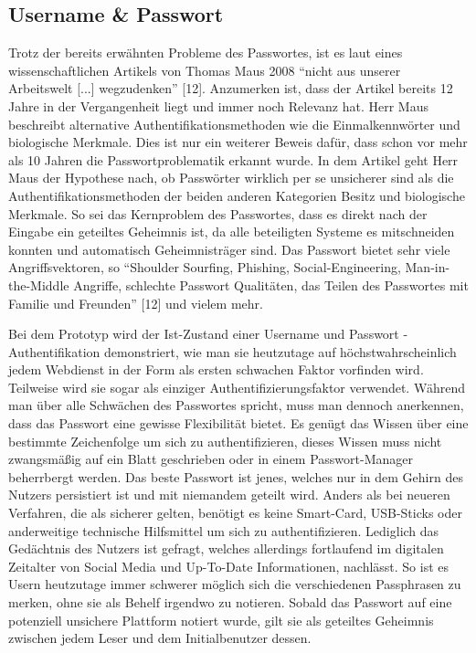 \subsection{Username \& Passwort}
Trotz der bereits erwähnten Probleme des Passwortes, ist es laut eines wissenschaftlichen Artikels von Thomas Maus 2008 ``nicht aus unserer Arbeitswelt [...] wegzudenken'' [12]. Anzumerken ist, dass der Artikel bereits 12 Jahre in der Vergangenheit liegt und immer noch Relevanz hat. Herr Maus beschreibt alternative Authentifikationsmethoden wie die Einmalkennwörter und biologische Merkmale. Dies ist nur ein weiterer Beweis dafür, dass schon vor mehr als 10 Jahren die Passwortproblematik erkannt wurde. In dem Artikel geht Herr Maus der Hypothese nach, ob Passwörter wirklich per se unsicherer sind als die Authentifikationsmethoden der beiden anderen Kategorien Besitz und biologische Merkmale. So sei das Kernproblem des Passwortes, dass es direkt nach der Eingabe ein geteiltes Geheimnis ist, da alle beteiligten Systeme es mitschneiden konnten und automatisch Geheimnisträger sind. Das Passwort bietet sehr viele Angriffsvektoren, so ``Shoulder Sourfing, Phishing, Social-Engineering, Man-in-the-Middle Angriffe, schlechte Passwort Qualitäten, das Teilen des Passwortes mit Familie und Freunden'' [12] und vielem mehr.

Bei dem Prototyp wird der Ist-Zustand einer Username und Passwort - Authentifikation demonstriert, wie man sie heutzutage auf höchstwahrscheinlich jedem Webdienst in der Form als ersten schwachen Faktor vorfinden wird. Teilweise wird sie sogar als einziger Authentifizierungsfaktor verwendet. Während man über alle Schwächen des Passwortes spricht, muss man dennoch anerkennen, dass das Passwort eine gewisse Flexibilität bietet. Es genügt das Wissen über eine bestimmte Zeichenfolge um sich zu authentifizieren, dieses Wissen muss nicht zwangsmäßig auf ein Blatt geschrieben oder in einem Passwort-Manager beherrbergt werden. Das beste Passwort ist jenes, welches nur in dem Gehirn des Nutzers persistiert ist und mit niemandem geteilt wird. Anders als bei neueren Verfahren, die als sicherer gelten, benötigt es keine Smart-Card, USB-Sticks oder anderweitige technische Hilfsmittel um sich zu authentifizieren. Lediglich das Gedächtnis des Nutzers ist gefragt, welches allerdings fortlaufend im digitalen Zeitalter von Social Media und Up-To-Date Informationen, nachlässt. So ist es Usern heutzutage immer schwerer möglich sich die verschiedenen Passphrasen zu merken, ohne sie als Behelf irgendwo zu notieren. Sobald das Passwort auf eine potenziell unsichere Plattform notiert wurde, gilt sie als geteiltes Geheimnis zwischen jedem Leser und dem Initialbenutzer dessen.
\newpage

